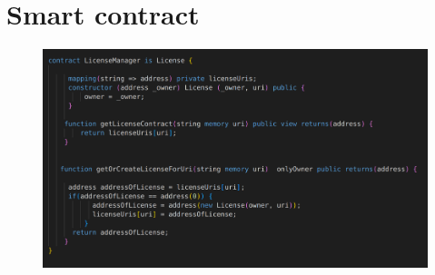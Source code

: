 
\chapter{Smart contract}
\begin{center}
	\begin{figure}[htb!]
		
		\begin{minipage}{0.43\linewidth}
			\centering
			\includegraphics[width=1.95\textwidth]{images/chap03_sc_manager.png}
		\end{minipage}
		
	\end{figure}
	
\end{center}
